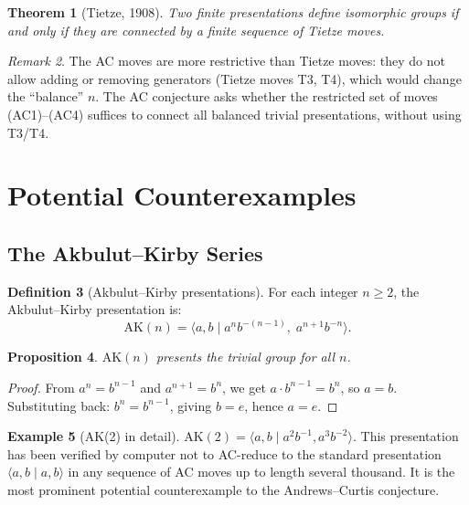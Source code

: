 \documentclass[12pt,a4paper]{amsart}
\newtheorem{theorem}{Theorem}[section]
\newtheorem{proposition}[theorem]{Proposition}
\theoremstyle{definition}
\newtheorem{definition}[theorem]{Definition}
\newtheorem{example}[theorem]{Example}
\theoremstyle{remark}
\newtheorem{remark}[theorem]{Remark}
\begin{document}
\begin{theorem}[Tietze, 1908]
Two finite presentations define isomorphic groups if and only if they are
connected by a finite sequence of Tietze moves.
\end{theorem}

\begin{remark}
The AC moves are more restrictive than Tietze moves: they do not allow adding
or removing generators (Tietze moves T3, T4), which would change the ``balance''
$n$. The AC conjecture asks whether the restricted set of moves (AC1)--(AC4)
suffices to connect all balanced trivial presentations, without using T3/T4.
\end{remark}

\section{Potential Counterexamples}

\subsection{The Akbulut--Kirby Series}

\begin{definition}[Akbulut--Kirby presentations]\label{def:AK}
For each integer $n \geq 2$, the Akbulut--Kirby presentation is:
\[
  \mathrm{AK}(n) = \langle a, b \mid a^n b^{-(n-1)},\; a^{n+1} b^{-n} \rangle.
\]
\end{definition}

\begin{proposition}
$\mathrm{AK}(n)$ presents the trivial group for all $n$.
\end{proposition}

\begin{proof}
From $a^n = b^{n-1}$ and $a^{n+1} = b^n$, we get $a \cdot b^{n-1} = b^n$,
so $a = b$. Substituting back: $b^n = b^{n-1}$, giving $b = e$, hence $a = e$.
\end{proof}

\begin{example}[AK(2) in detail]
$\mathrm{AK}(2) = \langle a,b \mid a^2 b^{-1}, a^3 b^{-2} \rangle$.
This presentation has been verified by computer not to AC-reduce to the
standard presentation $\langle a,b \mid a,b \rangle$ in any sequence of
AC moves up to length several thousand. It is the most prominent potential
counterexample to the Andrews--Curtis conjecture.
\end{example}
\end{document}
